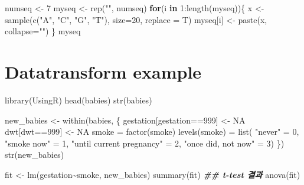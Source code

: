 \documentclass[
]{book}
\newenvironment{Shaded}{\begin{snugshade}}{\end{snugshade}}
\newcommand{\AttributeTok}[1]{\textcolor[rgb]{0.77,0.63,0.00}{#1}}
\newcommand{\ConstantTok}[1]{\textcolor[rgb]{0.00,0.00,0.00}{#1}}
\newcommand{\ControlFlowTok}[1]{\textcolor[rgb]{0.13,0.29,0.53}{\textbf{#1}}}
\newcommand{\DecValTok}[1]{\textcolor[rgb]{0.00,0.00,0.81}{#1}}
\newcommand{\DocumentationTok}[1]{\textcolor[rgb]{0.56,0.35,0.01}{\textbf{\textit{#1}}}}
\newcommand{\FunctionTok}[1]{\textcolor[rgb]{0.00,0.00,0.00}{#1}}
\newcommand{\NormalTok}[1]{#1}
\newcommand{\OtherTok}[1]{\textcolor[rgb]{0.56,0.35,0.01}{#1}}
\newcommand{\SpecialCharTok}[1]{\textcolor[rgb]{0.00,0.00,0.00}{#1}}
\newcommand{\StringTok}[1]{\textcolor[rgb]{0.31,0.60,0.02}{#1}}
\begin{document}
\begin{Shaded}
\begin{Highlighting}[]
\NormalTok{numseq }\OtherTok{\textless{}{-}} \DecValTok{7}
\NormalTok{myseq }\OtherTok{\textless{}{-}} \FunctionTok{rep}\NormalTok{(}\StringTok{""}\NormalTok{, numseq)}
\ControlFlowTok{for}\NormalTok{(i }\ControlFlowTok{in} \DecValTok{1}\SpecialCharTok{:}\FunctionTok{length}\NormalTok{(myseq))\{}
\NormalTok{  x }\OtherTok{\textless{}{-}} \FunctionTok{sample}\NormalTok{(}\FunctionTok{c}\NormalTok{(}\StringTok{"A"}\NormalTok{, }\StringTok{"C"}\NormalTok{, }\StringTok{"G"}\NormalTok{, }\StringTok{"T"}\NormalTok{), }\AttributeTok{size=}\DecValTok{20}\NormalTok{, }\AttributeTok{replace =}\NormalTok{ T)}
\NormalTok{  myseq[i] }\OtherTok{\textless{}{-}} \FunctionTok{paste}\NormalTok{(x, }\AttributeTok{collapse=}\StringTok{""}\NormalTok{)}
\NormalTok{\}}
\NormalTok{myseq}
\end{Highlighting}
\end{Shaded}

\hypertarget{datatransform-example}{%
\section{Datatransform example}\label{datatransform-example}}

\begin{Shaded}
\begin{Highlighting}[]
\FunctionTok{library}\NormalTok{(UsingR)}
\FunctionTok{head}\NormalTok{(babies)}
\FunctionTok{str}\NormalTok{(babies)}


\NormalTok{new\_babies }\OtherTok{\textless{}{-}} \FunctionTok{within}\NormalTok{(babies, \{}
\NormalTok{  gestation[gestation}\SpecialCharTok{==}\DecValTok{999}\NormalTok{] }\OtherTok{\textless{}{-}} \ConstantTok{NA}
\NormalTok{  dwt[dwt}\SpecialCharTok{==}\DecValTok{999}\NormalTok{] }\OtherTok{\textless{}{-}} \ConstantTok{NA}
\NormalTok{  smoke }\OtherTok{=} \FunctionTok{factor}\NormalTok{(smoke)}
  \FunctionTok{levels}\NormalTok{(smoke) }\OtherTok{=} \FunctionTok{list}\NormalTok{(}
    \StringTok{"never"} \OtherTok{=} \DecValTok{0}\NormalTok{, }
    \StringTok{"smoke now"} \OtherTok{=} \DecValTok{1}\NormalTok{, }
    \StringTok{"until current pregnancy"} \OtherTok{=} \DecValTok{2}\NormalTok{,}
    \StringTok{"once did, not now"} \OtherTok{=} \DecValTok{3}\NormalTok{)}
\NormalTok{  \})}
\FunctionTok{str}\NormalTok{(new\_babies)}

\NormalTok{fit }\OtherTok{\textless{}{-}} \FunctionTok{lm}\NormalTok{(gestation}\SpecialCharTok{\textasciitilde{}}\NormalTok{smoke, new\_babies)}
\FunctionTok{summary}\NormalTok{(fit) }\DocumentationTok{\#\# t{-}test 결과 }
\FunctionTok{anova}\NormalTok{(fit)}
\end{Highlighting}
\end{Shaded}


  
\end{document}
